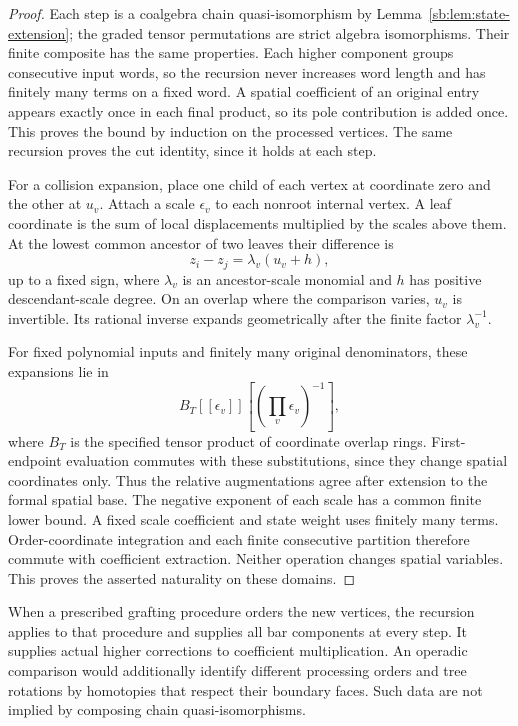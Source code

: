 \begin{proof}
Each step is a coalgebra chain quasi-isomorphism by
Lemma~\ref{sb:lem:state-extension}; the graded tensor permutations are
strict algebra isomorphisms.  Their finite composite has the same
properties.  Each higher component groups consecutive input words,
so the recursion never increases word length and has finitely many
terms on a fixed word.  A spatial coefficient of an original entry
appears exactly once in each final product, so its pole contribution
is added once.  This proves the bound by induction on the processed
vertices.  The same recursion proves the cut identity, since it holds
at each step.

For a collision expansion, place one child of each vertex at coordinate
zero and the other at \(u_v\).  Attach a scale \(\epsilon_v\)
to each nonroot internal vertex.  A leaf coordinate is the sum of
local displacements multiplied by the scales above them.  At the
lowest common ancestor of two leaves their difference is
\[
 z_i-z_j=\lambda_v(u_v+h),
\]
up to a fixed sign, where \(\lambda_v\) is an ancestor-scale
monomial and \(h\) has positive descendant-scale degree.
On an overlap where the comparison varies, \(u_v\) is invertible.
Its rational inverse expands geometrically after the finite factor
\(\lambda_v^{-1}\).

For fixed polynomial inputs and finitely many original denominators,
these expansions lie in
\[
 B_T[[\epsilon_v]][(\prod_v\epsilon_v)^{-1}],
\]
where \(B_T\) is the specified tensor product of coordinate overlap
rings.  First-endpoint evaluation commutes with these substitutions,
since they change spatial coordinates only.  Thus the relative
augmentations agree after extension to the formal spatial base.
The negative exponent of each scale has a common finite lower
bound.  A fixed scale coefficient and state weight uses finitely many
terms.  Order-coordinate integration and each finite consecutive
partition therefore commute with coefficient extraction.  Neither
operation changes spatial variables.  This proves the asserted
naturality on these domains.
\end{proof}

When a prescribed grafting procedure orders the new vertices, the
recursion applies to that procedure and supplies all bar components
at every step.  It supplies actual higher corrections to coefficient
multiplication.  An operadic comparison would additionally identify
different processing orders and tree rotations by homotopies that
respect their boundary faces.  Such data are not implied by composing
chain quasi-isomorphisms.

